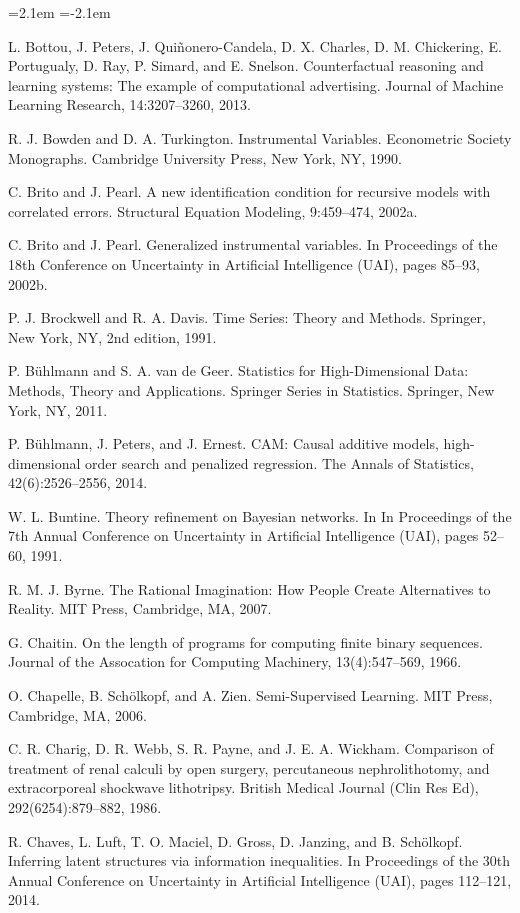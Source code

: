 \begin{list}{}{\leftmargin=2.1em
 \itemindent=-2.1em\parsep=0pt\itemsep=3pt}
\item L. Bottou, J. Peters, J. Quiñonero-Candela, D. X. Charles, D. M. Chickering, E. Portugualy, D. Ray, P. Simard, and E. Snelson. Counterfactual reasoning and learning systems: The example of computational advertising. Journal of Machine Learning Research, 14:3207--3260, 2013.
\item R. J. Bowden and D. A. Turkington. Instrumental Variables. Econometric Society Monographs. Cambridge University Press, New York, NY, 1990.
\item C. Brito and J. Pearl. A new identification condition for recursive models with correlated errors. Structural Equation Modeling, 9:459--474, 2002a.
\item C. Brito and J. Pearl. Generalized instrumental variables. In Proceedings of the 18th Conference on Uncertainty in Artificial Intelligence (UAI), pages 85--93, 2002b.
\item P. J. Brockwell and R. A. Davis. Time Series: Theory and Methods. Springer, New York, NY, 2nd edition, 1991.
\item P. Bühlmann and S. A. van de Geer. Statistics for High-Dimensional Data: Methods, Theory and Applications. Springer Series in Statistics. Springer, New York, NY, 2011.
\item P. Bühlmann, J. Peters, and J. Ernest. CAM: Causal additive models, high-dimensional order search and penalized regression. The Annals of Statistics, 42(6):2526--2556, 2014.
\item W. L. Buntine. Theory refinement on Bayesian networks. In In Proceedings of the 7th Annual Conference on Uncertainty in Artificial Intelligence (UAI), pages 52--60, 1991.
\item R. M. J. Byrne. The Rational Imagination: How People Create Alternatives to Reality. MIT Press, Cambridge, MA, 2007.
\item G. Chaitin. On the length of programs for computing finite binary sequences. Journal of the Assocation for Computing Machinery, 13(4):547--569, 1966.
\item O. Chapelle, B. Schölkopf, and A. Zien. Semi-Supervised Learning. MIT Press, Cambridge, MA, 2006.
\item C. R. Charig, D. R. Webb, S. R. Payne, and J. E. A. Wickham. Comparison of treatment of renal calculi by open surgery, percutaneous nephrolithotomy, and extracorporeal shockwave lithotripsy. British Medical Journal (Clin Res Ed), 292(6254):879--882, 1986.
\item R. Chaves, L. Luft, T. O. Maciel, D. Gross, D. Janzing, and B. Schölkopf. Inferring latent structures via information inequalities. In Proceedings of the 30th Annual Conference on Uncertainty in Artificial Intelligence (UAI), pages 112--121, 2014.

\end{list}
